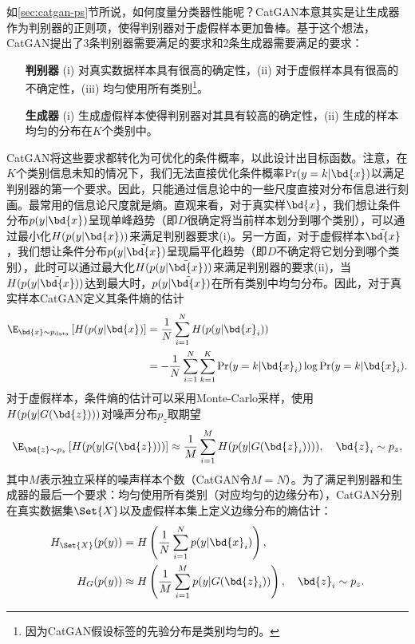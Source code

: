 如\ref{sec:catgan-ps}节所说，如何度量分类器性能呢？CatGAN本意其实是让生成器作为判别器的正则项，使得判别器对于虚假样本更加鲁棒。基于这个想法，CatGAN提出了3条判别器需要满足的要求和2条生成器需要满足的要求：
\begin{itemize}
  \item[\textbf{判别器}](i) 对真实数据样本具有很高的确定性，(ii) 对于虚假样本具有很高的不确定性，(iii) 均匀使用所有类别\footnote{因为CatGAN假设标签的先验分布是类别均匀的。}。
  \item[\textbf{生成器}](i) 生成虚假样本使得判别器对其具有较高的确定性，(ii) 生成的样本均匀的分布在$K$个类别中。
\end{itemize}

CatGAN将这些要求都转化为可优化的条件概率，以此设计出目标函数。注意，在$K$个类别信息未知的情况下，我们无法直接优化条件概率$\Pr(y=k|\bd{x})$以满足判别器的第一个要求。因此，只能通过信息论中的一些尺度直接对分布信息进行刻画。最常用的信息论尺度就是熵。直观来看，对于真实样$\bd{x}$，我们想让条件分布$p(y|\bd{x})$呈现单峰趋势（即$D$很确定将当前样本划分到哪个类别），可以通过最小化$H(p(y|\bd{x}))$来满足判别器要求(i)。另一方面，对于虚假样本$\tilde{\bd{x}}$，我们想让条件分布$p(y|\tilde{\bd{x}})$呈现扁平化趋势（即$D$不确定将它划分到哪个类别），此时可以通过最大化$H(p(y|\tilde{\bd{x}}))$来满足判别器的要求(ii)，当$H(p(y|\tilde{\bd{x}}))$达到最大时，$p(y|\tilde{\bd{x}})$在所有类别中均匀分布。因此，对于真实样本CatGAN定义其条件熵的估计
\begin{equation}
  \begin{split}
    \E_{ \bd{x} \sim p_{\text{data}} } \left[ H(p(y|\bd{x}) \right]
      &= \frac{1}{N} \sum_{i=1}^N H(p(y|\bd{x}_i)) \\
      &= -\frac{1}{N} \sum_{i=1}^N \sum_{k=1}^K \Pr(y=k|\bd{x}_i) \log\Pr(y=k|\bd{x}_i).
  \end{split}
  \label{eq:hy_given_x_real}
\end{equation}
对于虚假样本，条件熵的估计可以采用Monte-Carlo采样，使用$H(p(y|G(\bd{z})))$对噪声分布$p_z$取期望
\begin{equation}
  \E_{ \bd{z} \sim p_z } \left[ H(p(y|G(\bd{z}))) \right]
  \approx \frac{1}{M} \sum_{i=1}^M H(p(y|G(\bd{z}_i)))), \quad \bd{z}_i \sim p_z,
  \label{eq:hy_give_x_fake}
\end{equation}
其中$M$表示独立采样的噪声样本个数（CatGAN令$M=N$）。为了满足判别器和生成器的最后一个要求：均匀使用所有类别（对应均匀的边缘分布），CatGAN分别在真实数据集$\Set{X}$以及虚假样本集上定义边缘分布的熵估计：
\begin{equation}
  \begin{split}
    H_{\Set{X}}(p(y)) &= H\left( \frac{1}{N} \sum_{i=1}^N p(y|\bd{x}_i) \right), \\
    H_{G}(p(y)) &\approx H\left( \frac{1}{M} \sum_{i=1}^M p(y|G(\bd{z}_i)) \right), \quad \bd{z}_i \sim p_z.
  \end{split}
  \label{eq:hy}
\end{equation}

